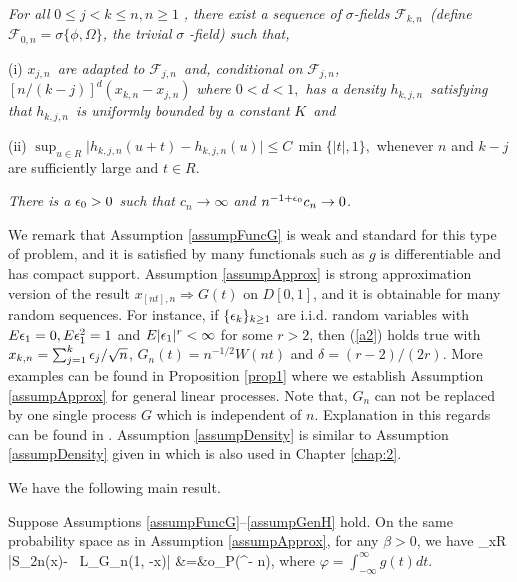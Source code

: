 \begin{assump} 
 \textit{For all }$0\leq j<k\leq n,n\geq 1$%
\textit{, there exist  a
sequence of }$\sigma $\textit{-fields }${\mathcal F}_{k,n}$\textit{\ (define }$%
{\mathcal F}_{0,n}=\sigma \{\phi ,\Omega \}$\textit{, the trivial }$\sigma $\textit{%
-field) such that,}

(i) $x_{j,n}$\textit{\ are adapted to }${\mathcal F}_{j,n}$\textit{\
and, conditional on }${\mathcal F}_{j,n}$\textit{,
}$[n/(k-j)]^d(x_{k,n}-x_{j,n})$\textit{ where $0<d<1,$ has a density
}$h_{k,j,n}$\textit{\ satisfying that }$h_{k,j,n}$\textit{\ is
uniformly bounded by a constant }$K$\textit{\ and }%

(ii) $  \sup_{u\in R}\big|h_{k,j,n}(u+t)-h_{k,j,n}(u)\big|\le C\, \min\{|t|, 1\},$
whenever $n$ and $k-j$ are sufficiently large and $t\in R$.
\end{assump}

\begin{assump} 
 \textit{There is a $\epsilon_0>0$ such that $c_n\to\infty$ and $n^{-1+\epsilon_0}c_n\to 0$. }
\end{assump}

We remark that Assumption \ref{assumpFuncG} is weak and standard
  for this type of problem, and it is satisfied by many functionals such as $g$ is differentiable and has compact support. Assumption \ref{assumpApprox} is strong approximation version of the result $x_{[nt],n}\Rightarrow G(t)$ on $D[0,1]$, and it is obtainable for many random sequences. For instance,  if $\{\epsilon_k\}_{k\ge 1}$ are i.i.d. random variables with $E\epsilon_1=0, E\epsilon_1^2=1$ and $E|\epsilon_1|^{r}<\infty$
  for some $r>2$, then (\ref {a2}) holds true with $x_{k,n}=\sum_{j=1}^k\epsilon_j/\sqrt n$, $G_n(t) = n^{-1/2} W(nt)$ and $\delta=(r - 2) / (2r)$. More examples can be found in Proposition \ref{prop1} where we establish  Assumption \ref{assumpApprox} for general linear processes. Note that, $G_n$ can not be replaced by one single process $G$ which is independent of $n$. Explanation in this regards can be found in \cite{csorgorevesz1981}.
  Assumption \ref{assumpDensity} is  similar to Assumption \ref{assumpDensity} given in \cite{wangphillips2010a} which is also used in Chapter \ref{chap:2}.



We have the following main result.

\begin{thm}  Suppose Assumptions \ref{assumpFuncG}--\ref{assumpGenH} hold. On the same probability space as in Assumption \ref{assumpApprox}, for any $\beta>0$,
we have
\be {}
\sup_{x\in R} \Big |S_{2n}(x)- \varphi\, L_{G_n}(1, -x)\Big| &=&o_P(\log^{-\beta} n),
\ee
where $\varphi= \int_{-\infty}^{\infty} g(t) dt$.
\end{thm}

